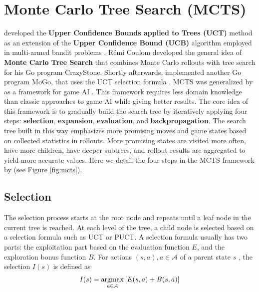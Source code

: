 \section{Monte Carlo Tree Search (MCTS)} \label{sec:mcts}

\citeauthor{BanditBasedMonteCarlo_Kocsis.Szepesvari_2006} developed the \textbf{Upper Confidence Bounds applied to Trees (UCT)} method as an extension of the \textbf{Upper Confidence Bound (UCB)} algorithm employed in multi-armed bandit problems \cite{BanditBasedMonteCarlo_Kocsis.Szepesvari_2006}.
Rémi Coulom developed the general idea of \textbf{Monte Carlo Tree Search} that combines Monte Carlo rollouts with tree search \cite{EfficientSelectivityBackup_Coulom_2007} for his Go program CrazyStone.
Shortly afterwards,
\citeauthor{ModificationUCTPatterns_Gelly.Wang.ea_2006} implemented another Go program MoGo, that uses the UCT selection formula \cite{ModificationUCTPatterns_Gelly.Wang.ea_2006}.
MCTS was generalized by \citeauthor{MonteCarloTreeSearch_Chaslot.Bakkes.ea_2008} as a framework for game AI \cite{MonteCarloTreeSearch_Chaslot.Bakkes.ea_2008}.
This framework requires less domain knowledge than classic approaches to game AI while giving better results.
The core idea of this framework is to gradually build the search tree by iteratively applying four steps: \textbf{selection}, \textbf{expansion}, \textbf{evaluation}, and \textbf{backpropagation}.
The search tree built in this way emphasizes more promising moves and game states based on collected statistics in rollouts.
More promising states are visited more often, have more children, have deeper subtrees, and rollout results are aggregated to yield more accurate values. Here we detail the four steps in the MCTS framework by \citeauthor{MonteCarloTreeSearch_Chaslot.Bakkes.ea_2008} (see Figure \ref{fig:mcts}).


\subsection{Selection}
The selection process starts at the root node and repeats until a leaf node in the current tree is reached.
At each level of the tree, a child node is selected based on a selection formula such as UCT or PUCT.
A selection formula usually has two parts: the exploitation part based on the evaluation function $E$, and the exploration bonus function $B$.
For actions $(s, a), a \in \mathcal{A}$ of a parent state $s$ , the selection $I(s)$ is defined as
\begin{align*}
    I(s) = \operatorname*{argmax}_{a \in \mathcal{A}}{\left[ E(s, a) + B(s, a) \right]}
    \label{eq:mcts_selection}
\end{align*}

